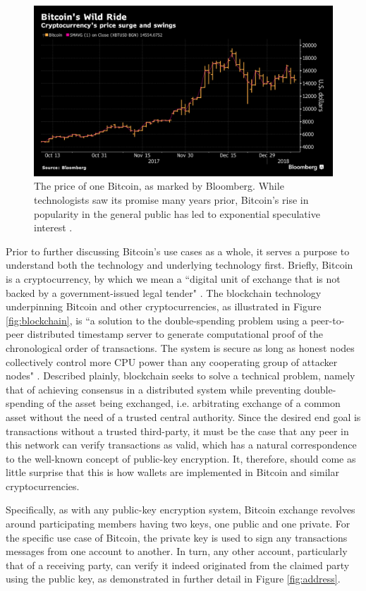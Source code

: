\documentclass{article}
\begin{document}
\begin{figure}
    \label{fig:BTC_price}
    \centering
    \includegraphics[width=.50\textwidth]{BTC_price.png}
    \caption[Bitcoin Price]{The price of one Bitcoin, as marked by Bloomberg. While technologists saw its promise many years prior, Bitcoin's rise in popularity in the general public has led to exponential speculative interest \cite{goldman}.}
\end{figure}

Prior to further discussing Bitcoin's use cases as a whole, it serves a purpose to understand both the technology and underlying technology first. Briefly, Bitcoin is a cryptocurrency, by which we mean a ``digital unit of exchange that is not backed by a government-issued legal tender" \cite{virtual}. The blockchain technology underpinning Bitcoin and other cryptocurrencies, as illustrated in Figure \ref{fig:blockchain}, is ``a solution to the double-spending problem using a peer-to-peer distributed timestamp server to generate computational proof of the chronological order of transactions. The system is secure as long as honest nodes collectively control more CPU power than any cooperating group of attacker nodes" \cite{bitcoin}. Described plainly, blockchain seeks to solve a technical problem, namely that of achieving consensus in a distributed system while preventing double-spending of the asset being exchanged, i.e. arbitrating exchange of a common asset without the need of a trusted central authority. Since the desired end goal is transactions without a trusted third-party, it must be the case that any peer in this network can verify transactions as valid, which has a natural correspondence to the well-known concept of public-key encryption. It, therefore, should come as little surprise that this is how wallets are implemented in Bitcoin and similar cryptocurrencies.

Specifically, as with any public-key encryption system, Bitcoin exchange revolves around participating members having two keys, one public and one private. For the specific use case of Bitcoin, the private key is used to sign any transactions messages from one account to another. In turn, any other account, particularly that of a receiving party, can verify it indeed originated from the claimed party using the public key, as demonstrated in further detail in Figure \ref{fig:address}.
\end{document}
